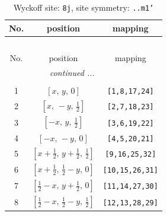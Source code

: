 \documentclass[fleqn,8pt]{jsarticle}
\begin{document}
\begin{longtable}{ccc}
\caption{Wyckoff site: {\tt 8j}, site symmetry: {\tt ..m1'}}
 \\
 \hline \hline
No. & position & mapping \\ \hline \endfirsthead

\multicolumn{2}{l}{\tablename\ \thetable{}} \\
 \hline \hline
No. & position & mapping \\ \hline \endhead

 \hline \hline
\multicolumn{2}{r}{\footnotesize\it continued ...} \\ \endfoot

 \hline \hline
\multicolumn{2}{r}{} \\ \endlastfoot

1 & $\left[ x,\, y,\, 0 \right]$ & {\tt [1,8,17,24]} \\ \hline
2 & $\left[ x,\, - y,\, \frac{1}{2} \right]$ & {\tt [2,7,18,23]} \\ \hline
3 & $\left[ - x,\, y,\, \frac{1}{2} \right]$ & {\tt [3,6,19,22]} \\ \hline
4 & $\left[ - x,\, - y,\, 0 \right]$ & {\tt [4,5,20,21]} \\ \hline
5 & $\left[ x + \frac{1}{2},\, y + \frac{1}{2},\, \frac{1}{2} \right]$ & {\tt [9,16,25,32]} \\ \hline
6 & $\left[ x + \frac{1}{2},\, \frac{1}{2} - y,\, 0 \right]$ & {\tt [10,15,26,31]} \\ \hline
7 & $\left[ \frac{1}{2} - x,\, y + \frac{1}{2},\, 0 \right]$ & {\tt [11,14,27,30]} \\ \hline
8 & $\left[ \frac{1}{2} - x,\, \frac{1}{2} - y,\, \frac{1}{2} \right]$ & {\tt [12,13,28,29]} \\
\end{longtable}
\renewcommand{\arraystretch}{1.2}
\end{document}
